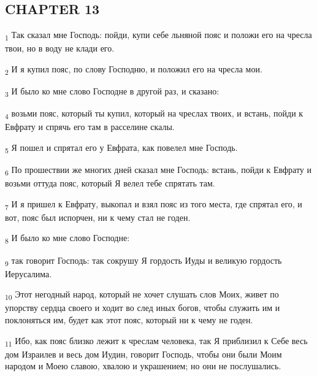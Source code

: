 \subsection{CHAPTER 13}
\begin{tcolorbox}
\textsubscript{1} Так сказал мне Господь: пойди, купи себе льняной пояс и положи его на чресла твои, но в воду не клади его.
\end{tcolorbox}
\begin{tcolorbox}
\textsubscript{2} И я купил пояс, по слову Господню, и положил его на чресла мои.
\end{tcolorbox}
\begin{tcolorbox}
\textsubscript{3} И было ко мне слово Господне в другой раз, и сказано:
\end{tcolorbox}
\begin{tcolorbox}
\textsubscript{4} возьми пояс, который ты купил, который на чреслах твоих, и встань, пойди к Евфрату и спрячь его там в расселине скалы.
\end{tcolorbox}
\begin{tcolorbox}
\textsubscript{5} Я пошел и спрятал его у Евфрата, как повелел мне Господь.
\end{tcolorbox}
\begin{tcolorbox}
\textsubscript{6} По прошествии же многих дней сказал мне Господь: встань, пойди к Евфрату и возьми оттуда пояс, который Я велел тебе спрятать там.
\end{tcolorbox}
\begin{tcolorbox}
\textsubscript{7} И я пришел к Евфрату, выкопал и взял пояс из того места, где спрятал его, и вот, пояс был испорчен, ни к чему стал не годен.
\end{tcolorbox}
\begin{tcolorbox}
\textsubscript{8} И было ко мне слово Господне:
\end{tcolorbox}
\begin{tcolorbox}
\textsubscript{9} так говорит Господь: так сокрушу Я гордость Иуды и великую гордость Иерусалима.
\end{tcolorbox}
\begin{tcolorbox}
\textsubscript{10} Этот негодный народ, который не хочет слушать слов Моих, живет по упорству сердца своего и ходит во след иных богов, чтобы служить им и поклоняться им, будет как этот пояс, который ни к чему не годен.
\end{tcolorbox}
\begin{tcolorbox}
\textsubscript{11} Ибо, как пояс близко лежит к чреслам человека, так Я приблизил к Себе весь дом Израилев и весь дом Иудин, говорит Господь, чтобы они были Моим народом и Моею славою, хвалою и украшением; но они не послушались.
\end{tcolorbox}
